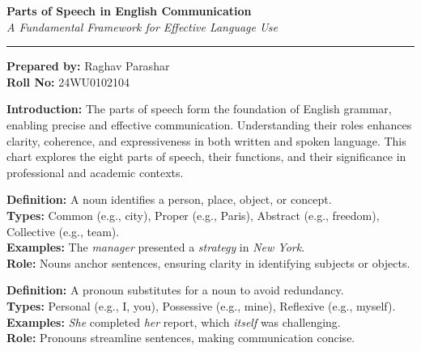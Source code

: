 \documentclass[a4paper,11pt]{article}
\title{}
\author{}
\date{}
\begin{document}
\begin{center}
    {\LARGE\bfseries\color{navyblue} Parts of Speech in English Communication} \\
    \vspace{0.1cm}
    {\small\itshape A Fundamental Framework for Effective Language Use} \\
    \vspace{0.1cm}
    \hrule height 1pt
    \vspace{0.1cm}
\end{center}

\begin{flushright}
    \small \textbf{Prepared by:} Raghav Parashar \\
    \small \textbf{Roll No:} 24WU0102104
    \vspace{0.2cm}
\end{flushright}

{\footnotesize \textbf{Introduction:} The parts of speech form the foundation of English grammar, enabling precise and effective communication. Understanding their roles enhances clarity, coherence, and expressiveness in both written and spoken language. This chart explores the eight parts of speech, their functions, and their significance in professional and academic contexts.}

\vspace{0.2cm}

\begin{tcolorbox}[colback=lightgray, colframe=navyblue, sharp corners, boxrule=0.5mm, title=\textbf{1. Noun: The Core of Identification}, boxsep=2pt, left=2pt, right=2pt, top=2pt, bottom=2pt]
    \footnotesize \textbf{Definition:} A noun identifies a person, place, object, or concept. \\
    \textbf{Types:} Common (e.g., city), Proper (e.g., Paris), Abstract (e.g., freedom), Collective (e.g., team). \\
    \textbf{Examples:} The \textit{manager} presented a \textit{strategy} in \textit{New York}. \\
    \textbf{Role:} Nouns anchor sentences, ensuring clarity in identifying subjects or objects.
\end{tcolorbox}

\begin{tcolorbox}[colback=lightgray, colframe=navyblue, sharp corners, boxrule=0.5mm, title=\textbf{2. Pronoun: Enhancing Efficiency}, boxsep=2pt, left=2pt, right=2pt, top=2pt, bottom=2pt]
    \footnotesize \textbf{Definition:} A pronoun substitutes for a noun to avoid redundancy. \\
    \textbf{Types:} Personal (e.g., I, you), Possessive (e.g., mine), Reflexive (e.g., myself). \\
    \textbf{Examples:} \textit{She} completed \textit{her} report, which \textit{itself} was challenging. \\
    \textbf{Role:} Pronouns streamline sentences, making communication concise.
\end{tcolorbox}
\end{document}
